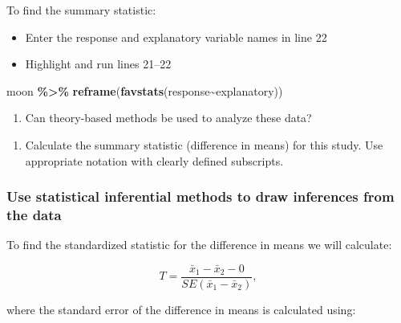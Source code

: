 \documentclass[
]{report}
\newenvironment{Shaded}{\begin{snugshade}}{\end{snugshade}}
\newcommand{\FunctionTok}[1]{\textcolor[rgb]{0.13,0.29,0.53}{\textbf{#1}}}
\newcommand{\NormalTok}[1]{#1}
\newcommand{\SpecialCharTok}[1]{\textcolor[rgb]{0.81,0.36,0.00}{\textbf{#1}}}
\providecommand{\tightlist}{%
  \setlength{\itemsep}{0pt}\setlength{\parskip}{0pt}}
\begin{document}
To find the summary statistic:

\begin{itemize}
\item
  Enter the response and explanatory variable names in line 22
\item
  Highlight and run lines 21--22
\end{itemize}

\begin{Shaded}
\begin{Highlighting}[]
\NormalTok{moon }\SpecialCharTok{\%\textgreater{}\%}
  \FunctionTok{reframe}\NormalTok{(}\FunctionTok{favstats}\NormalTok{(response}\SpecialCharTok{\textasciitilde{}}\NormalTok{explanatory))}
\end{Highlighting}
\end{Shaded}

\begin{enumerate}
\def\labelenumi{\arabic{enumi}.}
\setcounter{enumi}{3}
\tightlist
\item
  Can theory-based methods be used to analyze these data?
\end{enumerate}

\vspace{1.2in}

\begin{enumerate}
\def\labelenumi{\arabic{enumi}.}
\setcounter{enumi}{4}
\tightlist
\item
  Calculate the summary statistic (difference in means) for this study. Use appropriate notation with clearly defined subscripts.
\end{enumerate}

\vspace{1in}

\subsubsection*{Use statistical inferential methods to draw inferences from the data}\label{use-statistical-inferential-methods-to-draw-inferences-from-the-data-6}

To find the standardized statistic for the difference in means we will calculate:

\[T = \frac{\bar{x}_1-\bar{x}_2 -0}{SE(\bar{x}_1-\bar{x}_2)},\]

where the standard error of the difference in means is calculated using:
\end{document}
